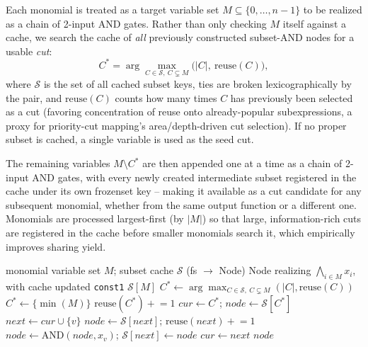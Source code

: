 \documentclass[conference]{IEEEtran}
\begin{document}
Each monomial is treated as a target variable set
$M\subseteq\{0,\dots,n-1\}$ to be realized as a chain of 2-input AND
gates. Rather than only checking $M$ itself against a cache, we search
the cache of \emph{all} previously constructed subset-AND nodes for a
usable \emph{cut}:
\begin{equation}
C^\ast = \arg\max_{C \in \mathcal{S},\ C \subsetneq M}
\big(|C|,\ \mathrm{reuse}(C)\big),
\end{equation}
where $\mathcal S$ is the set of all cached subset keys, ties are
broken lexicographically by the pair, and $\mathrm{reuse}(C)$ counts
how many times $C$ has previously been selected as a cut (favoring
concentration of reuse onto already-popular subexpressions, a proxy for
priority-cut mapping's area/depth-driven cut selection). If no proper
subset is cached, a single variable is used as the seed cut.

The remaining variables $M\setminus C^\ast$ are then appended one at a
time as a chain of 2-input AND gates, with every newly created
intermediate subset registered in the cache under its own frozenset
key -- making it available as a cut candidate for any subsequent
monomial, whether from the same output function or a different one.
Monomials are processed largest-first (by $|M|$) so that large,
information-rich cuts are registered in the cache before smaller
monomials search it, which empirically improves sharing yield.

\begin{algorithm}
\caption{Priority-cut AND-node construction for a monomial}
\label{alg:pcutand}
\begin{algorithmic}[1]
\Require monomial variable set $M$; subset cache $\mathcal S$ (fs $\to$ Node)
\Ensure Node realizing $\bigwedge_{i\in M} x_i$, with cache updated
 \Return \texttt{const1} \EndIf
{} \Return $\mathcal S[M]$ \EndIf
\State $C^\ast \gets \arg\max_{C\in\mathcal S,\ C\subsetneq M} (|C|, \mathrm{reuse}(C))$
  \State $C^\ast \gets \{\min(M)\}$ 
\EndIf
\State $\mathrm{reuse}(C^\ast) \mathrel{+}= 1$
\State $cur \gets C^\ast$; $node \gets \mathcal S[C^\ast]$
  \State $next \gets cur \cup \{v\}$
    \State $node \gets \mathcal S[next]$; $\mathrm{reuse}(next) \mathrel{+}= 1$
  \Else
    \State $node \gets \mathrm{AND}(node, x_v)$; \quad $\mathcal S[next] \gets node$
  \EndIf
  \State $cur \gets next$
\EndFor
\State \Return $node$
\end{algorithmic}
\end{algorithm}
\end{document}
